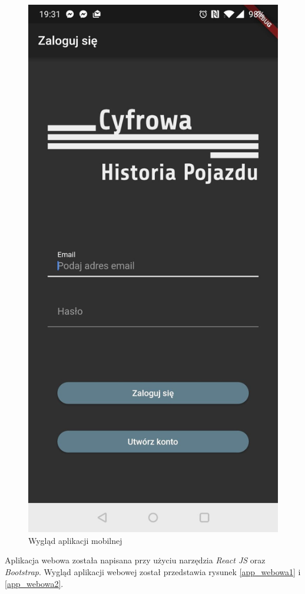 \documentclass[12pt]{article}
\begin{document}
\begin{figure}[H]
		\includegraphics[scale=0.20]{app_mobilna2.png}
		\caption{Wygląd aplikacji mobilnej}
		\label{app_mobilna}
	\end{figure}

Aplikacja webowa została napisana przy użyciu narzędzia \textit{React JS} oraz \textit{Bootstrap}.
Wygląd aplikacji webowej został przedstawia rysunek  \ref{app_webowa1} i \ref{app_webowa2}.
\end{document}
